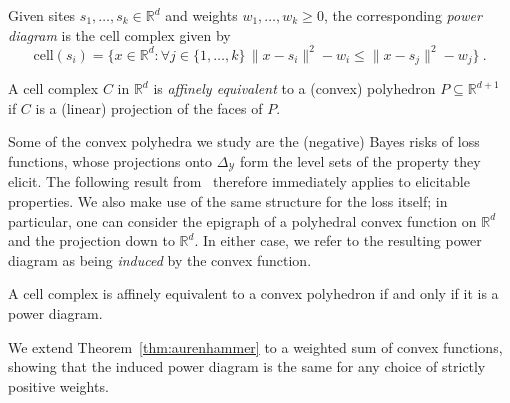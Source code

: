 \documentclass[twoside,11pt]{article}
\newcommand{\Comments}{1}
\newcommand{\mynote}[2]{\ifnum\Comments=1\textcolor{#1}{#2}\fi}
\newcommand{\raf}[1]{\mynote{darkgreen}{[RF: #1]}}
\newcommand{\reals}{\mathbb{R}}
\newcommand{\cell}{\mathrm{cell}}
\newcommand{\simplex}{\Delta_\Y}
\newcommand{\Y}{\mathcal{Y}}
\begin{document}
\begin{definition}\label{def:power-diagram}
  Given sites $s_1,\ldots,s_k\in\reals^d$ and weights $w_1,\ldots,w_k \geq 0$, the corresponding \emph{power diagram} is the cell complex given by
  \begin{equation}
    \label{eq:pd}
    \cell(s_i) = \{ x \in\reals^d : \forall j \in \{1,\ldots,k\} \, \|x - s_i\|^2 - w_i \leq \|x - s_j\|^2 - w_j\}~.
  \end{equation}
\end{definition}

\begin{definition}\label{def:affine-equiv}
  A cell complex $C$ in $\reals^d$ is \emph{affinely equivalent} to a (convex) polyhedron $P \subseteq \reals^{d+1}$ if $C$ is a (linear) projection of the faces of $P$.
\end{definition}

Some of the convex polyhedra we study are the (negative) Bayes risks of loss functions, whose projections onto $\simplex$ form the level sets of the property they elicit.
The following result from~\citet{aurenhammer1987power} therefore immediately applies to elicitable properties.
We also make use of the same structure for the loss itself; in particular, one can consider the epigraph of a polyhedral convex function on $\reals^d$ and the projection down to $\reals^d$.
In either case, we refer to the resulting power diagram as being \emph{induced} by the convex function.

\begin{theorem}\label{thm:aurenhammer}
	A cell complex is affinely equivalent to a convex polyhedron if and only if it is a power diagram.
\end{theorem}

We extend Theorem~\ref{thm:aurenhammer} to a weighted sum of convex functions, showing that the induced power diagram is the same for any choice of strictly positive weights.
\end{document}

